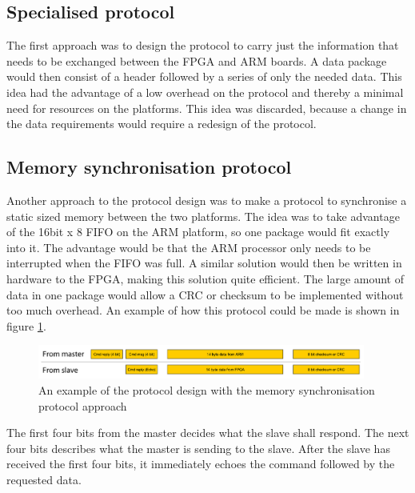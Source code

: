 \subsection{Specialised protocol}
The first approach was to design the protocol to carry just the information that needs to be exchanged between the FPGA and ARM boards. A data package would then consist of a header followed by a series of only the needed data. This idea had the advantage of a low overhead on the protocol and thereby a minimal need for resources on the platforms. This idea was discarded, because a change in the data requirements would require a redesign of the protocol.

\subsection{Memory synchronisation protocol}
Another approach to the protocol design was to make a protocol to synchronise a static sized memory between the two platforms. The idea was to take advantage of the 16bit x 8 FIFO on the ARM platform, so one package would fit exactly into it. The advantage would be that the ARM processor only needs to be interrupted when the FIFO was full. A similar solution would then be written in hardware to the FPGA, making this solution quite efficient. The large amount of data in one package would allow a CRC or checksum to be implemented without too much overhead. An example of how this protocol could be made is shown in figure \ref{fig:spi_protocol_format_memsync}.

\begin{figure}[htb]
	\centering
	\includegraphics[width=0.96\textwidth,trim=0 0 0 0]{graphics/spi_protocol_format_memsync.pdf} %
	\caption{An example of the protocol design with the memory synchronisation protocol approach}
	\label{fig:spi_protocol_format_memsync}			%
\end{figure}

The first four bits from the master decides what the slave shall respond. The next four bits describes what the master is sending to the slave. After the slave has received the first four bits, it immediately echoes the command followed by the requested data.

